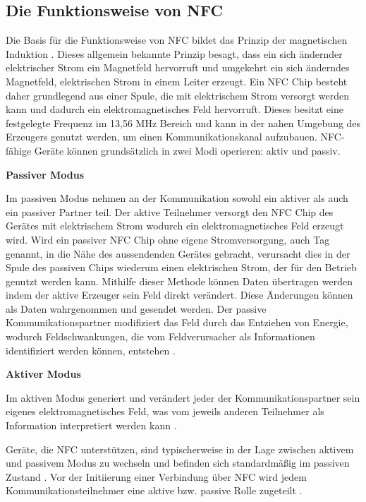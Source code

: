 \subsection{Die Funktionsweise von NFC}

Die Basis für die Funktionsweise von NFC bildet das Prinzip der magnetischen Induktion \cite{introToRfid}. Dieses allgemein bekannte Prinzip besagt, dass ein sich ändernder elektrischer Strom ein Magnetfeld hervorruft und umgekehrt ein sich änderndes Magnetfeld, elektrischen Strom in einem Leiter erzeugt. Ein NFC Chip besteht daher grundlegend aus einer Spule, die mit elektrischem Strom versorgt werden kann und dadurch ein elektromagnetisches Feld hervorruft. Dieses besitzt eine festgelegte Frequenz im 13,56 MHz Bereich \cite{introToRfid} und kann in der nahen Umgebung des Erzeugers genutzt werden, um einen Kommunikationskanal aufzubauen. NFC-fähige Geräte können grundsätzlich in zwei Modi operieren: aktiv und passiv. 
\newline

\textbf{Passiver Modus}

Im passiven Modus nehmen an der Kommunikation sowohl ein aktiver als auch ein passiver Partner teil. 
Der aktive Teilnehmer versorgt den NFC Chip des Gerätes mit elektrischem Strom wodurch ein elektromagnetisches Feld erzeugt wird. Wird ein passiver NFC Chip ohne eigene Stromversorgung, auch Tag genannt, in die Nähe des aussendenden Gerätes gebracht, verursacht dies in der Spule des passiven Chips wiederum einen elektrischen Strom, der für den Betrieb genutzt werden kann. 
Mithilfe dieser Methode können Daten übertragen werden indem der aktive Erzeuger sein Feld direkt verändert. Diese Änderungen können als Daten wahrgenommen und gesendet werden. Der passive Kommunikationspartner modifiziert das Feld durch das Entziehen von Energie, wodurch Feldschwankungen, die vom Feldverursacher als Informationen identifiziert werden können, entstehen \cite{Madlmayr2014}. 
\newline

\textbf{Aktiver Modus}

Im aktiven Modus generiert und verändert jeder der Kommunikationspartner sein eigenes elektromagnetisches Feld, was vom jeweils anderen Teilnehmer als Information interpretiert werden kann \cite{Madlmayr2014}. 
\newline

Geräte, die NFC unterstützen, sind typischerweise in der Lage zwischen aktivem und passivem Modus zu wechseln und befinden sich standardmäßig im passiven Zustand \cite{cuno:nfc}. Vor der Initiierung einer Verbindung über NFC wird jedem Kommunikationsteilnehmer eine aktive bzw. passive Rolle zugeteilt \cite{Madlmayr2014}. 

